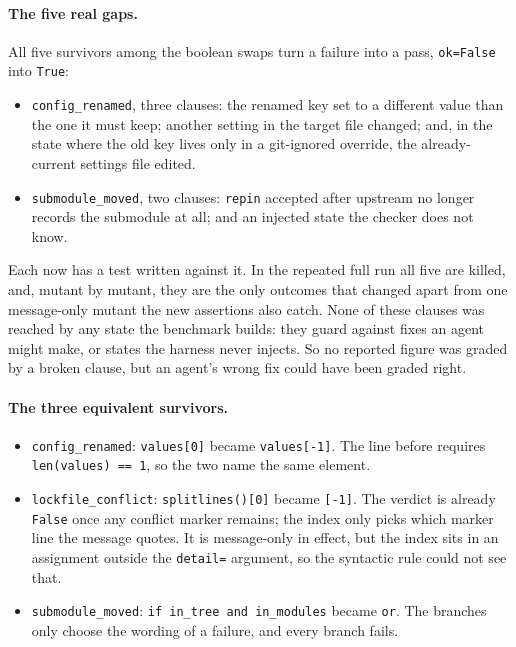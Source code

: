 \documentclass[11pt]{article}
\newcommand{\code}[1]{\texttt{#1}}
\begin{document}
\paragraph{The five real gaps.}
All five survivors among the boolean swaps turn a failure into a pass, \code{ok=False} into
\code{True}:
\begin{itemize}
  \item \code{config\_renamed}, three clauses: the renamed key set to a different value than the
  one it must keep; another setting in the target file changed; and, in the state where the old
  key lives only in a git-ignored override, the already-current settings file edited.
  \item \code{submodule\_moved}, two clauses: \code{repin} accepted after upstream no longer
  records the submodule at all; and an injected state the checker does not know.
\end{itemize}
Each now has a test written against it. In the repeated full run all five are killed, and,
mutant by mutant, they are the only outcomes that changed apart from one message-only mutant
the new assertions also catch. None of these clauses was reached by any state the benchmark builds:
they guard against fixes an agent might make, or states the harness never injects. So no reported
figure was graded by a broken clause, but an agent's wrong fix could have been graded right.

\paragraph{The three equivalent survivors.}
\begin{itemize}
  \item \code{config\_renamed}: \code{values[0]} became \code{values[-1]}. The line before
  requires \code{len(values) == 1}, so the two name the same element.
  \item \code{lockfile\_conflict}: \code{splitlines()[0]} became \code{[-1]}. The verdict is
  already \code{False} once any conflict marker remains; the index only picks which marker line
  the message quotes. It is message-only in effect, but the index sits in an assignment outside
  the \code{detail=} argument, so the syntactic rule could not see that.
  \item \code{submodule\_moved}: \code{if in\_tree and in\_modules} became \code{or}. The
  branches only choose the wording of a failure, and every branch fails.
\end{itemize}
\end{document}
